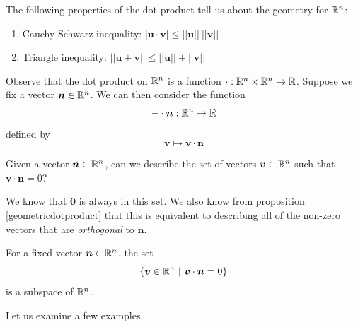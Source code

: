 \begin{theorem}
    
    The following properties of the dot product tell us about the geometry for $\mathbb{R}^n$:
    
    \begin{enumerate}
        \item Cauchy-Schwarz inequality: $| \bm{u} \cdot \bm{v} | \leq  || \bm{u}|| \ || \bm{v} ||$
        \item Triangle inequality: $|| \bm{u}+ \bm{v} || \leq  || \bm{u}|| +|| \bm{v} ||$
    \end{enumerate}
    
    \end{theorem}



Observe that the dot product on $\mathbb{R}^n$ is a function $\cdot: \mathbb{R}^n \times \mathbb{R}^n \to \mathbb{R}$.  Suppose we fix a vector $\bm{n} \in \mathbb{R}^n$.  We can then consider the function $$- \cdot \bm{n} : \mathbb{R}^n\to \mathbb{R}$$ defined by $$\bm{v} \mapsto \bm{v} \cdot \bm{n}$$


\begin{motivating}
Given a vector $\bm{n} \in \mathbb{R}^n$, can we describe the set of vectors $\bm{v} \in \mathbb{R}^n$ such that $\bm{v} \cdot \bm{n} = 0$?
\end{motivating}

We know that $\bm{0}$ is always in this set.  We also know from proposition \ref{geometricdotproduct} that this is equivalent to describing all of the non-zero vectors that are \textit{orthogonal} to $\bm{n}$. 

\begin{proposition}
    For a fixed vector $\bm{n} \in \mathbb{R}^n$, the set 
    $$\{\bm{v} \in \mathbb{R}^n \ | \ \bm{v} \cdot \bm{n} = 0\}$$ is a subspace of $\mathbb{R}^n$.
\end{proposition}


Let us examine a few examples.

